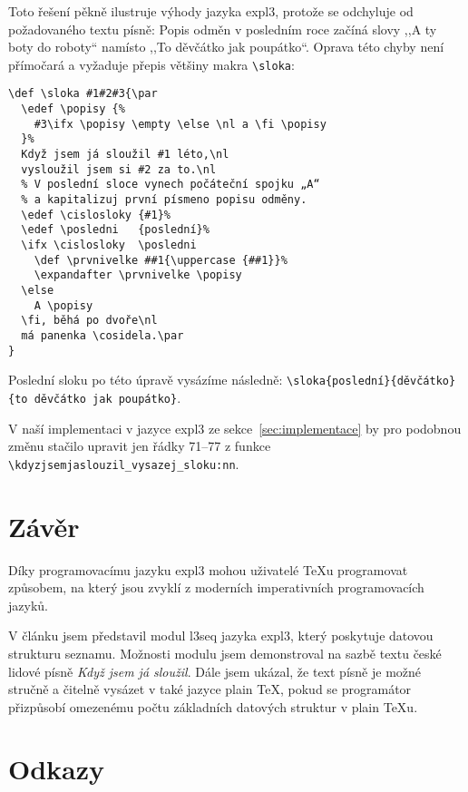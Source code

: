 \documentclass{csbulletin}
\newenvironment{mintedblock}{%
  \par\vspace{\topsep}\vspace{\partopsep}%
  \begingroup
  \fvset{listparameters=\setlength{\topsep}{0pt}\setlength{\partopsep}{0pt}}%
}{%
  \endgroup
  \par\vspace{\topsep}\vspace{\partopsep}%
}
\newcommand\pkg{\textsf}
\begin{document}
Toto řešení pěkně ilustruje výhody jazyka expl3, protože se odchyluje od požadovaného textu písně: Popis odměn v posledním roce začíná slovy ,,A ty boty do roboty`` namísto ,,To děvčátko jak poupátko``. Oprava této chyby není přímočará a vyžaduje přepis většiny makra \verb"\sloka":

\begin{mintedblock}
\begin{verbatim}
\def \sloka #1#2#3{\par
  \edef \popisy {%
    #3\ifx \popisy \empty \else \nl a \fi \popisy
  }%
  Když jsem já sloužil #1 léto,\nl
  vysloužil jsem si #2 za to.\nl
  % V poslední sloce vynech počáteční spojku „A“
  % a kapitalizuj první písmeno popisu odměny.
  \edef \cislosloky {#1}%
  \edef \posledni   {poslední}%
  \ifx \cislosloky  \posledni
    \def \prvnivelke ##1{\uppercase {##1}}%
    \expandafter \prvnivelke \popisy
  \else
    A \popisy
  \fi, běhá po dvoře\nl
  má panenka \cosidela.\par
}
\end{verbatim}
\end{mintedblock}

\noindent
Poslední sloku po této úpravě vysázíme následně: \verb"\sloka{poslední}{děvčátko}"
\verb"{to děvčátko jak poupátko}".

V naší implementaci v jazyce expl3 ze sekce~\ref{sec:implementace} by pro podobnou změnu stačilo upravit jen řádky 71--77 z funkce \verb"\kdyzjsemjaslouzil_vysazej_sloku:nn".

\section{Závěr}
\label{sec:zaver}

Díky programovacímu jazyku expl3 mohou uživatelé \TeX u programovat způsobem, na který jsou zvyklí z moderních imperativních programovacích jazyků.

V článku jsem představil modul \pkg{l3seq} jazyka expl3, který poskytuje datovou strukturu seznamu. Možnosti modulu jsem demonstroval na sazbě textu české lidové písně \emph{Když jsem já sloužil}.
Dále jsem ukázal, že text písně je možné stručně a čitelně vysázet v také jazyce plain \TeX{}, pokud se programátor přizpůsobí omezenému počtu základních datových struktur v plain \TeX u.

\section*{Odkazy}
\vspace*{-0.1cm}
\printbibliography[heading=none]
\end{document}
